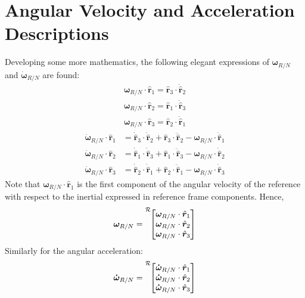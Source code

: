 \documentclass[]{AVSSimReportMemo}
\begin{document}
\section{Angular Velocity and Acceleration Descriptions}
Developing some more mathematics, the following elegant expressions of $\bm\omega_{R/N}$ and $\dot{\bm\omega}_{R/N}$ are found:
\begin{subequations}
	\begin{align}
		\bm\omega_{R/N} \cdot \hat{\bm r}_{1}  = \hat{\bm r}_{3} \cdot \dot{\hat{\bm r}}_{2}  \\
		\bm\omega_{R/N} \cdot \hat{\bm r}_{2} = \hat{\bm r}_{1} \cdot \dot{\hat{\bm r}}_{3}\\
		\bm\omega_{R/N} \cdot \hat{\bm r}_{3} = \hat{\bm r}_{2} \cdot \dot{\hat{\bm r}}_{1}
	\end{align}
\end{subequations}
\begin{subequations}
	\begin{align}
		\dot{\bm\omega}_{R/N} \cdot \hat{\bm r}_{1} &=
		\dot{\hat{\bm r}}_{3} \cdot \dot{\hat{\bm r}}_{2} + \hat{\bm r}_{3} \cdot \ddot{\hat{\bm r}}_{2} -  \bm\omega_{R/N} \cdot \dot{\hat{\bm r}}_{1}
		\\
		\dot{\bm\omega}_{R/N} \cdot \hat{\bm r}_{2} &=
		 \dot{\hat{\bm r}}_{1} \cdot \dot{\hat{\bm r}}_{3} + \hat{\bm r}_{1} \cdot \ddot{\hat{\bm r}}_{3} -  \bm\omega_{R/N} \cdot \dot{\hat{\bm r}}_{2}
		\\
		\dot{\bm\omega}_{R/N} \cdot \hat{\bm r}_{3} &=
		\dot{\hat{\bm r}}_{2} \cdot \dot{\hat{\bm r}}_{1} + \hat{\bm r}_{2} \cdot \ddot{\hat{\bm r}}_{1} -  \bm\omega_{R/N} \cdot \dot{\hat{\bm r}}_{3}
	\end{align}
\end{subequations}
Note that $\bm\omega_{R/N} \cdot \hat{\bm r}_{1}$ is the first component of the angular velocity of the reference with respect to the inertial expressed in reference frame components. Hence,
\begin{equation}
	\bm\omega_{R/N}= \leftexp{R}{
		\begin{bmatrix}
			\bm\omega_{R/N} \cdot \hat{\bm r}_{1} \\
			\bm\omega_{R/N} \cdot \hat{\bm r}_{2}  \\
			\bm\omega_{R/N} \cdot \hat{\bm r}_{3}
		\end{bmatrix}
	}
\end{equation}
Similarly for the angular acceleration:
\begin{equation}
	\bm{\dot\omega}_{R/N} = \leftexp{R}{
		\begin{bmatrix}
			\bm{\dot\omega}_{R/N} \cdot \hat{\bm r}_{1} \\
			\bm{\dot\omega}_{R/N} \cdot \hat{\bm r}_{2}  \\
			\bm{\dot\omega}_{R/N} \cdot \hat{\bm r}_{3}
		\end{bmatrix}
	}
\end{equation}
\end{document}

